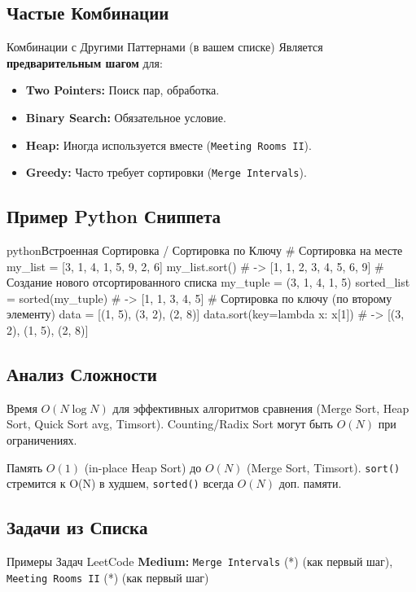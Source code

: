 \subsection{Частые Комбинации}
\begin{myblock}{Комбинации с Другими Паттернами (в вашем списке)}
    Является \textbf{предварительным шагом} для:
    \begin{itemize}[nosep, leftmargin=*]
        \item \textbf{Two Pointers:} Поиск пар, обработка.
        \item \textbf{Binary Search:} Обязательное условие.
        \item \textbf{Heap:} Иногда используется вместе (\texttt{Meeting Rooms II}).
        \item \textbf{Greedy:} Часто требует сортировки (\texttt{Merge Intervals}).
    \end{itemize}
\end{myblock}

\subsection{Пример Python Сниппета}
\begin{codebox}{python}{Встроенная Сортировка / Сортировка по Ключу}
# Сортировка на месте
my_list = [3, 1, 4, 1, 5, 9, 2, 6]
my_list.sort() # -> [1, 1, 2, 3, 4, 5, 6, 9]
# Создание нового отсортированного списка
my_tuple = (3, 1, 4, 1, 5)
sorted_list = sorted(my_tuple) # -> [1, 1, 3, 4, 5]
# Сортировка по ключу (по второму элементу)
data = [(1, 5), (3, 2), (2, 8)]
data.sort(key=lambda x: x[1]) # -> [(3, 2), (1, 5), (2, 8)]
\end{codebox}

\subsection{Анализ Сложности}
\begin{myblock}{Время}
    $O(N \log N)$ для эффективных алгоритмов сравнения (Merge Sort, Heap Sort, Quick Sort avg, Timsort). Counting/Radix Sort могут быть $O(N)$ при ограничениях.
\end{myblock}
\begin{myblock}{Память}
    $O(1)$ (in-place Heap Sort) до $O(N)$ (Merge Sort, Timsort). \texttt{sort()} стремится к O(N) в худшем, \texttt{sorted()} всегда $O(N)$ доп. памяти.
\end{myblock}

\subsection{Задачи из Списка}
\begin{myblock}{Примеры Задач LeetCode}
    \textbf{Medium:} \texttt{Merge Intervals} (*) (как первый шаг), \texttt{Meeting Rooms II} (*) (как первый шаг)
\end{myblock}

